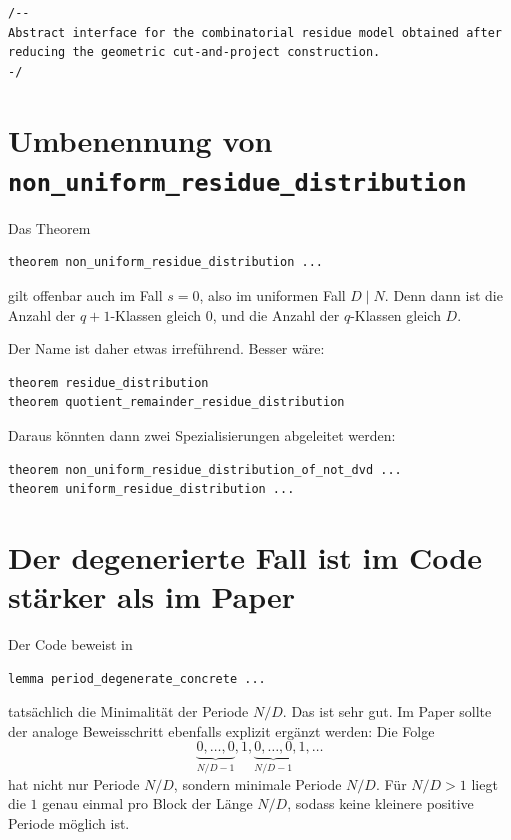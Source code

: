 \documentclass[11pt]{article}
\begin{document}
\begin{lstlisting}
/--
Abstract interface for the combinatorial residue model obtained after
reducing the geometric cut-and-project construction.
-/
\end{lstlisting}

\section{Umbenennung von \texttt{non\_uniform\_residue\_distribution}}

Das Theorem

\begin{lstlisting}
theorem non_uniform_residue_distribution ...
\end{lstlisting}

gilt offenbar auch im Fall \(s=0\), also im uniformen Fall \(D\mid N\). Denn dann ist die Anzahl der \(q+1\)-Klassen gleich \(0\), und die Anzahl der \(q\)-Klassen gleich \(D\).

Der Name ist daher etwas irreführend. Besser wäre:

\begin{lstlisting}
theorem residue_distribution
theorem quotient_remainder_residue_distribution
\end{lstlisting}

Daraus könnten dann zwei Spezialisierungen abgeleitet werden:

\begin{lstlisting}
theorem non_uniform_residue_distribution_of_not_dvd ...
theorem uniform_residue_distribution ...
\end{lstlisting}

\section{Der degenerierte Fall ist im Code stärker als im Paper}

Der Code beweist in

\begin{lstlisting}
lemma period_degenerate_concrete ...
\end{lstlisting}

tatsächlich die Minimalität der Periode \(N/D\). Das ist sehr gut. Im Paper sollte der analoge Beweisschritt ebenfalls explizit ergänzt werden: Die Folge
\[
    \underbrace{0,\ldots,0}_{N/D-1},1,
    \underbrace{0,\ldots,0}_{N/D-1},1,\ldots
\]
hat nicht nur Periode \(N/D\), sondern minimale Periode \(N/D\). Für \(N/D>1\) liegt die \(1\) genau einmal pro Block der Länge \(N/D\), sodass keine kleinere positive Periode möglich ist.
\end{document}
